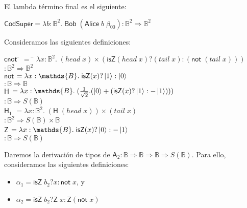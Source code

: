 \documentclass[a4paper,11pt]{article}
\begin{document}
El lambda término final es el siguiente:

\begin{tabbing}
  $\textsf{CodSuper} = \lambda b : \mathds{B}^2. \; \textsf{Bob} \; (\textsf{Alice} \; b \; \beta_{00}) 
  : \mathds{B}^2 \Rightarrow \mathds{B}^2$
\end{tabbing}

Consideramos las siguientes definiciones:

\begin{tabbing}
  $\textsf{cnot}$ \= $=$ \= $\lambda x: \mathds{B}^2. \; ( head \; x) \times (\textsf{isZ} ( head \; x) ?
  (tail \; x) : (\textsf{not} \; (tail \; x)))$ \\
  \> \> $: \mathds{B}^2 \Rightarrow \mathds{B}^2$ \\

  $\textsf{not}$ \> $= \lambda x: \mathds{B}. \; \textsf{isZ} (x) ? \ket{1} : \ket{0}$ \\
  \> \> $: \mathds{B} \Rightarrow \mathds{B}$ \\


  $\textsf{H}$ \> $= \lambda x : \mathds{B}. \; (\frac{1}{\sqrt{2}}.(\ket{0} + (\textsf{isZ}(x) ? \ket{1} : -\ket{1})))$ \\
  \> \> $: \mathds{B} \Rightarrow S(\mathds{B})$ \\

  $\textsf{H}_{1}$ \> $= \lambda x : \mathds{B}^2 . \; (\textsf{H} \; (head \; x)) \times (tail \; x)$ \\
  \> \> $: \mathds{B}^2 \Rightarrow S(\mathds{B}) \times \mathds{B}$ \\

  $\textsf{Z}$ \> $= \lambda x : \mathds{B}. \; \textsf{isZ}(x) ? \ket{0} : - \ket{1}$ \\
  \> \> $: \mathds{B} \Rightarrow S(\mathds{B})$ \\
\end{tabbing}

Daremos la derivación de tipos de $\textsf{A}_2 : \mathds{B} \Rightarrow \mathds{B} \Rightarrow \mathds{B} \Rightarrow S(\mathds{B})$.
Para ello, consideramos las siguientes definiciones: 

\begin{itemize}
\item $\alpha_1 = \textsf{isZ} \; b_2 ? x : \textsf{not} \; x$, y
\item $\alpha_2 = \textsf{isZ} \; b_2 ? \textsf{Z} \; x : \textsf{Z} (\textsf{not} \; x)$
\end{itemize}
\end{document}

